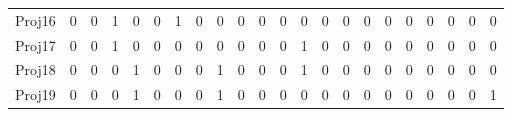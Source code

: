 \documentclass[8pt]{beamer}
\begin{document}
\begin{frame}[fragile]
\begin{columns}[c]
\begin{minipage}[c][.5\textheight][c]{\linewidth}
{\begin{table}
\begin{tabular}{c|ccccccccccccccccccccc}
Proj16 & 0  & 0  & 1  & 0  & 0  & 1   & 0   & 0   & 0   & 0  & 0  & 0  & 0  & 0  & 0  & 0  & 0  & 0  & 0  & 0  & 0 \\
Proj17 & 0  & 0  & 1  & 0  & 0  & 0   & 0   & 0   & 0   & 0  & 0  & 1  & 0  & 0  & 0  & 0  & 0  & 0  & 0  & 0  & 0 \\
Proj18 & 0  & 0  & 0  & 1  & 0  & 0   & 0   & 1   & 0   & 0  & 0  & 1  & 0  & 0  & 0  & 0  & 0  & 0  & 0  & 0  & 0 \\
Proj19 & 0  & 0  & 0  & 1  & 0  & 0   & 0   & 1   & 0   & 0  & 0  & 0  & 0  & 0  & 0  & 0  & 0  & 0  & 0  & 0  & 1\\
\bottomrule     
\end{tabular}
\end{table}
}




\end{minipage}
\end{columns}
\end{frame}
\end{document}

